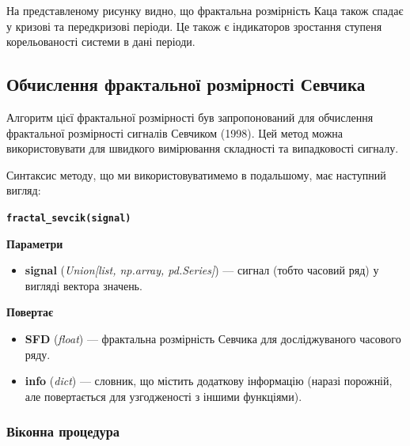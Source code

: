 \documentclass[
  letterpaper,
]{report}
\providecommand{\tightlist}{%
  \setlength{\itemsep}{0pt}\setlength{\parskip}{0pt}}\usepackage{longtable,booktabs,array}
\begin{document}
На представленому рисунку видно, що фрактальна розмірність Каца також
спадає у кризові та передкризові періоди. Це також є індикаторов
зростання ступеня корельованості системи в дані періоди.

\hypertarget{ux43eux431ux447ux438ux441ux43bux435ux43dux43dux44f-ux444ux440ux430ux43aux442ux430ux43bux44cux43dux43eux457-ux440ux43eux437ux43cux456ux440ux43dux43eux441ux442ux456-ux441ux435ux432ux447ux438ux43aux430}{%
\subsection{Обчислення фрактальної розмірності
Севчика}\label{ux43eux431ux447ux438ux441ux43bux435ux43dux43dux44f-ux444ux440ux430ux43aux442ux430ux43bux44cux43dux43eux457-ux440ux43eux437ux43cux456ux440ux43dux43eux441ux442ux456-ux441ux435ux432ux447ux438ux43aux430}}

Алгоритм цієї фрактальної розмірності був запропонований для обчислення
фрактальної розмірності сигналів Севчиком (1998). Цей метод можна
використовувати для швидкого вимірювання складності та випадковості
сигналу.

Синтаксис методу, що ми використовуватимемо в подальшому, має наступний
вигляд:

\textbf{\texttt{fractal\_sevcik(signal)}}

\textbf{Параметри}

\begin{itemize}
\tightlist
\item
  \textbf{signal} (\emph{Union{[}list, np.array, pd.Series{]}}) ---
  сигнал (тобто часовий ряд) у вигляді вектора значень.
\end{itemize}

\textbf{Повертає}

\begin{itemize}
\tightlist
\item
  \textbf{SFD} (\emph{float}) --- фрактальна розмірність Севчика для
  досліджуваного часового ряду.
\item
  \textbf{info} (\emph{dict}) --- словник, що містить додаткову
  інформацію (наразі порожній, але повертається для узгодженості з
  іншими функціями).
\end{itemize}

\hypertarget{ux432ux456ux43aux43eux43dux43dux430-ux43fux440ux43eux446ux435ux434ux443ux440ux430-6}{%
\subsubsection{Віконна
процедура}\label{ux432ux456ux43aux43eux43dux43dux430-ux43fux440ux43eux446ux435ux434ux443ux440ux430-6}}
\end{document}
